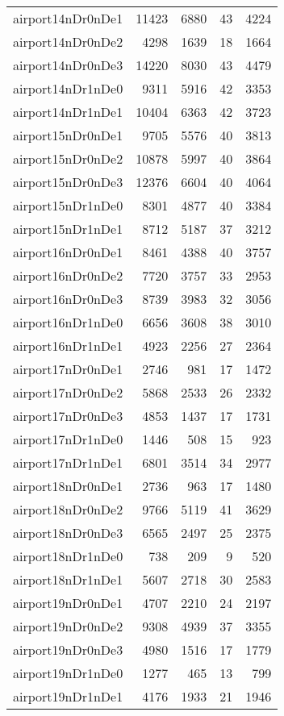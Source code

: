 \documentclass[../../../thesis.tex]{subfiles}
\begin{document}
\begin{longtable}{lrrrr}
airport14nDr0nDe1 & 11423 & 6880 & 43 & 4224 \\
airport14nDr0nDe2 & 4298 & 1639 & 18 & 1664 \\
airport14nDr0nDe3 & 14220 & 8030 & 43 & 4479 \\
airport14nDr1nDe0 & 9311 & 5916 & 42 & 3353 \\
airport14nDr1nDe1 & 10404 & 6363 & 42 & 3723 \\
airport15nDr0nDe1 & 9705 & 5576 & 40 & 3813 \\
airport15nDr0nDe2 & 10878 & 5997 & 40 & 3864 \\
airport15nDr0nDe3 & 12376 & 6604 & 40 & 4064 \\
airport15nDr1nDe0 & 8301 & 4877 & 40 & 3384 \\
airport15nDr1nDe1 & 8712 & 5187 & 37 & 3212 \\
airport16nDr0nDe1 & 8461 & 4388 & 40 & 3757 \\
airport16nDr0nDe2 & 7720 & 3757 & 33 & 2953 \\
airport16nDr0nDe3 & 8739 & 3983 & 32 & 3056 \\
airport16nDr1nDe0 & 6656 & 3608 & 38 & 3010 \\
airport16nDr1nDe1 & 4923 & 2256 & 27 & 2364 \\
airport17nDr0nDe1 & 2746 & 981 & 17 & 1472 \\
airport17nDr0nDe2 & 5868 & 2533 & 26 & 2332 \\
airport17nDr0nDe3 & 4853 & 1437 & 17 & 1731 \\
airport17nDr1nDe0 & 1446 & 508 & 15 & 923 \\
airport17nDr1nDe1 & 6801 & 3514 & 34 & 2977 \\
airport18nDr0nDe1 & 2736 & 963 & 17 & 1480 \\
airport18nDr0nDe2 & 9766 & 5119 & 41 & 3629 \\
airport18nDr0nDe3 & 6565 & 2497 & 25 & 2375 \\
airport18nDr1nDe0 & 738 & 209 & 9 & 520 \\
airport18nDr1nDe1 & 5607 & 2718 & 30 & 2583 \\
airport19nDr0nDe1 & 4707 & 2210 & 24 & 2197 \\
airport19nDr0nDe2 & 9308 & 4939 & 37 & 3355 \\
airport19nDr0nDe3 & 4980 & 1516 & 17 & 1779 \\
airport19nDr1nDe0 & 1277 & 465 & 13 & 799 \\
airport19nDr1nDe1 & 4176 & 1933 & 21 & 1946 \\

\end{longtable}
\end{document}
